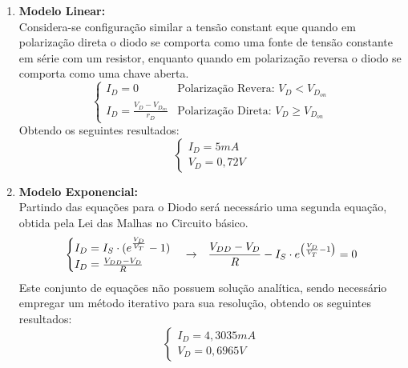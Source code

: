 \documentclass{article}
\begin{document}
\begin{enumerate}
                    \item \textbf{Modelo Linear:}\\
                    Considera-se configuração similar a tensão constant eque quando em polarização direta o diodo se comporta como uma fonte de tensão constante em série com um resistor, enquanto quando em polarização reversa o diodo se comporta como uma chave aberta.
                        \[
                            \begin{cases}
                                I_{D} = 0 &
                                \text{Polarização Revera: } V_{D} < V_{D_{on}}\\
                                I_{D} = \frac{V_{D} - V_{D_{on}}}{r_{D}} &
                                \text{Polarização Direta: } V_{D} \ge V_{D_{on}}
                            \end{cases}
                        \]
                    Obtendo os seguintes resultados:
                        \[
                            \boxed{
                                \begin{cases}
                                    I_{D} = 5 mA\\
                                    V_{D} = 0,72 V
                                \end{cases}
                            }
                        \]

                    \item \textbf{Modelo Exponencial:}\\
                    Partindo das equações para o Diodo será necessário uma segunda equação, obtida pela Lei das Malhas no Circuito básico.
                        \[
                            \begin{cases}
                                I_{D} = I_{S} \cdot (e^{\frac{V_{D}}{V_{T}}} - 1)\\
                                I_{D} = \frac{V_{DD} - V_{D}}{R}
                            \end{cases} \to \hspace{2.5mm}
                            \frac{V_{DD} - V_{D}}{R} - I_{S} \cdot e^{\left(\frac{V_{D}}{V_{T}} - 1\right)} = 0
                        \]
                    Este conjunto de equações não possuem solução analítica, sendo necessário empregar um método iterativo para sua resolução, obtendo os seguintes resultados:
                        \[
                            \boxed{
                                \begin{cases}
                                    I_{D} = 4,3035 mA\\
                                    V_{D} = 0,6965 V
                                \end{cases}
                            }
                        \]


\end{enumerate}
\end{document}
